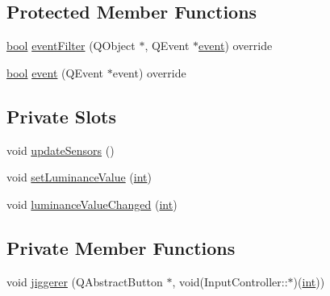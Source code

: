 \subsection*{Protected Member Functions}
\begin{DoxyCompactItemize}
\item 
\mbox{\hyperlink{libretro_8h_a4a26dcae73fb7e1528214a068aca317e}{bool}} \mbox{\hyperlink{class_q_g_b_a_1_1_sensor_view_ac36eccf225760726c912ab688ef41270}{event\+Filter}} (Q\+Object $\ast$, Q\+Event $\ast$\mbox{\hyperlink{class_q_g_b_a_1_1_sensor_view_a058b4e2baa8ca5f86d6335bc698da284}{event}}) override
\item 
\mbox{\hyperlink{libretro_8h_a4a26dcae73fb7e1528214a068aca317e}{bool}} \mbox{\hyperlink{class_q_g_b_a_1_1_sensor_view_a058b4e2baa8ca5f86d6335bc698da284}{event}} (Q\+Event $\ast$event) override
\end{DoxyCompactItemize}
\subsection*{Private Slots}
\begin{DoxyCompactItemize}
\item 
void \mbox{\hyperlink{class_q_g_b_a_1_1_sensor_view_aa80d32096bbd1abb428d05cf4124c1ba}{update\+Sensors}} ()
\item 
void \mbox{\hyperlink{class_q_g_b_a_1_1_sensor_view_ad6dec39ee47c69c736c18293da18527c}{set\+Luminance\+Value}} (\mbox{\hyperlink{ioapi_8h_a787fa3cf048117ba7123753c1e74fcd6}{int}})
\item 
void \mbox{\hyperlink{class_q_g_b_a_1_1_sensor_view_a76f391e13618d7f97f37076ce16ebd64}{luminance\+Value\+Changed}} (\mbox{\hyperlink{ioapi_8h_a787fa3cf048117ba7123753c1e74fcd6}{int}})
\end{DoxyCompactItemize}
\subsection*{Private Member Functions}
\begin{DoxyCompactItemize}
\item 
void \mbox{\hyperlink{class_q_g_b_a_1_1_sensor_view_a2747614dc92dfe149fff8cc532063fe6}{jiggerer}} (Q\+Abstract\+Button $\ast$, void(Input\+Controller\+::$\ast$)(\mbox{\hyperlink{ioapi_8h_a787fa3cf048117ba7123753c1e74fcd6}{int}}))
\end{DoxyCompactItemize}
